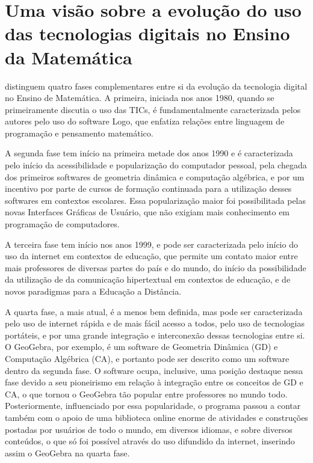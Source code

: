 \section{Uma visão sobre a evolução do uso das tecnologias digitais no Ensino da Matemática}

 distinguem quatro fases complementares entre si da evolução da tecnologia digital no Ensino de Matemática. A primeira, iniciada nos anos 1980, quando se primeiramente discutia o uso das TICs, é fundamentalmente caracterizada pelos autores pelo uso do software Logo, que enfatiza relações entre linguagem de programação e pensamento matemático.

A segunda fase tem início na primeira metade dos anos 1990 e é caracterizada pelo início da acessibilidade e popularização do computador pessoal, pela chegada dos primeiros softwares de geometria dinâmica e computação algébrica, e por um incentivo por parte de cursos de formação continuada para a utilização desses softwares em contextos escolares. Essa popularização maior foi possibilitada pelas novas Interfaces Gráficas de Usuário, que não exigiam mais conhecimento em programação de computadores.

A terceira fase tem início nos anos 1999, e pode ser caracterizada pelo início do uso da internet em contextos de educação, que permite um contato maior entre mais professores de diversas partes do país e do mundo, do início da possibilidade da utilização de da comunicação hipertextual em contextos de educação, e de novos paradigmas para a Educação a Distância.

A quarta fase, a mais atual, é a menos bem definida, mas pode ser caracterizada pelo uso de internet rápida e de mais fácil acesso a todos, pelo uso de tecnologias portáteis, e por uma grande integração e interconexão dessas tecnologias entre si.
\\

O GeoGebra, por exemplo, é um software de Geometria Dinâmica (GD) e Computação Algébrica (CA), e portanto pode ser descrito como um software dentro da segunda fase. O software ocupa, inclusive, uma posição destaque nessa fase devido a seu pioneirismo em relação à integração entre os conceitos de GD e CA, o que tornou o GeoGebra tão popular entre professores no mundo todo. Posteriormente, influenciado por essa popularidade, o programa passou a contar também com o apoio de uma biblioteca online enorme de atividades e construções postadas por usuários de todo o mundo, em diversos idiomas, e sobre diversos conteúdos, o que só foi possível através do uso difundido da internet, inserindo assim o GeoGebra na quarta fase.